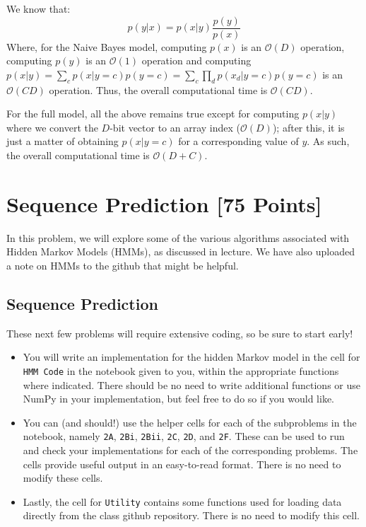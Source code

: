 \begin{solution}
  We know that:
  \begin{equation}
    p(y | x)= p(x | y) \frac{p(y)}{p(x)}
  \end{equation}
  Where, for the Naive Bayes model, computing $p(x)$ is an $\mathcal{O}(D)$ operation, computing $p(y)$ is an $\mathcal{O}(1)$ operation and computing $p(x | y)=\sum_cp(x | y=c)p(y=c)=\sum_c\prod_dp(x_d | y=c)p(y=c)$ is an $\mathcal{O}(CD)$ operation. Thus, the overall computational time is $\mathcal{O}(CD)$.

  For the full model, all the above remains true except for computing $p(x | y)$ where we convert the $D$-bit vector to an array index ($\mathcal{O}(D)$); after this, it is just a matter of obtaining $p(x | y=c)$ for a corresponding value of $y$. As such, the overall computational time is $\mathcal{O}(D+C)$.
\end{solution}


\newpage
\section{Sequence Prediction [75 Points]}

In this problem, we will explore some of the various algorithms associated with Hidden Markov Models (HMMs), as discussed in lecture.
We have also uploaded a note on HMMs to the github that might be helpful.

\subsection{Sequence Prediction}

These next few problems will require extensive coding, so be sure to start early! 
\begin{itemize}
  \item You will write an implementation for the hidden Markov model in the cell for \texttt{HMM Code} in the notebook given to you, within the appropriate functions where indicated. There should be no need to write additional functions or use NumPy in your implementation, but feel free to do so if you would like.
  \item You can (and should!) use the helper cells for each of the subproblems in the notebook, namely \texttt{2A}, \texttt{2Bi}, \texttt{2Bii}, \texttt{2C}, \texttt{2D}, and \texttt{2F}. These can be used to run and check your implementations for each of the corresponding problems. The cells provide useful output in an easy-to-read format. There is no need to modify these cells.
  \item Lastly, the cell for \texttt{Utility} contains some functions used for loading data directly from the class github repository. There is no need to modify this cell. \\
\end{itemize}

